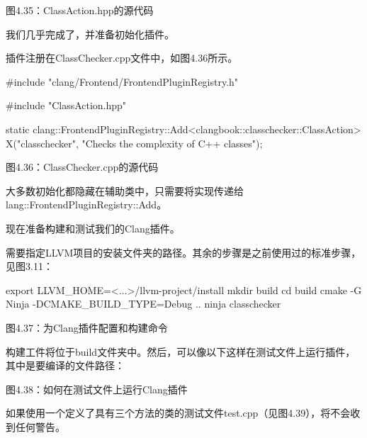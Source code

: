 \begin{center}
图4.35：ClassAction.hpp的源代码
\end{center}

我们几乎完成了，并准备初始化插件。


插件注册在ClassChecker.cpp文件中，如图4.36所示。

\begin{cpp}
#include "clang/Frontend/FrontendPluginRegistry.h"

#include "ClassAction.hpp"

static clang::FrontendPluginRegistry::Add<clangbook::classchecker::ClassAction>
X("classchecker", "Checks the complexity of C++ classes");
\end{cpp}

\begin{center}
图4.36：ClassChecker.cpp的源代码
\end{center}

大多数初始化都隐藏在辅助类中，只需要将实现传递给lang::FrontendPluginRegistry::Add。

现在准备构建和测试我们的Clang插件。


需要指定LLVM项目的安装文件夹的路径。其余的步骤是之前使用过的标准步骤，见图3.11：

\begin{shell}
export LLVM_HOME=<...>/llvm-project/install
mkdir build
cd build
cmake -G Ninja -DCMAKE_BUILD_TYPE=Debug ..
ninja classchecker
\end{shell}

\begin{center}
图4.37：为Clang插件配置和构建命令
\end{center}

构建工件将位于build文件夹中。然后，可以像以下这样在测试文件上运行插件，其中是要编译的文件路径：


\begin{center}
图4.38：如何在测试文件上运行Clang插件
\end{center}

如果使用一个定义了具有三个方法的类的测试文件test.cpp（见图4.39），将不会收到任何警告。

